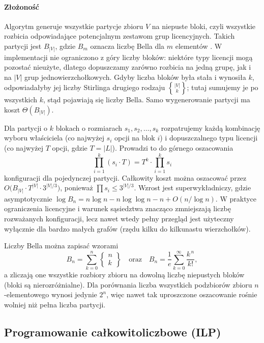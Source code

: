 \paragraph{Złożoność}
Algorytm generuje wszystkie partycje zbioru \(V\) na niepuste bloki, czyli wszystkie rozbicia odpowiadające potencjalnym zestawom grup licencyjnych. Takich partycji jest \(B_{|V|}\), gdzie \(B_m\) oznacza liczbę Bella dla \(m\) elementów \cite{stanley1997enumerative}. W implementacji nie ograniczono z góry liczby bloków: niektóre typy licencji mogą pozostać nieużyte, dlatego dopuszczamy zarówno rozbicia na jedną grupę, jak i na \(|V|\) grup jednowierzchołkowych. Gdyby liczba bloków była stała i wynosiła \(k\), odpowiadałyby jej liczby Stirlinga drugiego rodzaju \({|V| \brace k}\); tutaj sumujemy je po wszystkich \(k\), stąd pojawiają się liczby Bella. Samo wygenerowanie partycji ma koszt $\Theta(B_{|V|})$.

Dla partycji o \(k\) blokach o rozmiarach \(s_1, s_2, \ldots, s_k\) rozpatrujemy każdą kombinację wyboru właściciela (co najwyżej \(s_i\) opcji na blok \(i\)) i dopuszczalnego typu licencji (co najwyżej \(T\) opcji, gdzie \(T=|L|\)). Prowadzi to do górnego oszacowania
\[
  \prod_{i=1}^{k} (s_i \cdot T) = T^k \cdot \prod_{i=1}^{k} s_i
\]
konfiguracji dla pojedynczej partycji. Całkowity koszt można oszacować przez \(O\bigl(B_{|V|} \cdot T^{|V|} \cdot 3^{|V|/3}\bigr)\), ponieważ \(\prod s_i \leq 3^{|V|/3}\). Wzrost jest superwykładniczy, gdzie asymptotycznie \(\log B_n = n\log n - n\log\log n - n + O(n/\log n)\). W praktyce ograniczenia licencyjne i warunek sąsiedztwa znacząco zmniejszają liczbę rozważanych konfiguracji, lecz nawet wtedy pełny przegląd jest użyteczny wyłącznie dla bardzo małych grafów (rzędu kilku do kilkunastu wierzchołków).

Liczby Bella można zapisać wzorami
\[
  B_n = \sum_{k=0}^{n} \left\{\!\!\begin{array}{c} n \\ k \end{array}\!\!\right\}\quad\text{oraz}\quad B_n = \frac{1}{e}\sum_{k=0}^{\infty}\frac{k^{\,n}}{k!},
\]
a zliczają one wszystkie rozbiory zbioru na dowolną liczbę niepustych bloków (bloki są nierozróżnialne). Dla porównania liczba wszystkich podzbiorów zbioru \(n\)-elementowego wynosi jedynie \(2^n\), więc nawet tak uproszczone oszacowanie rośnie wolniej niż pełna liczba partycji.

\subsection{Programowanie całkowitoliczbowe (ILP)}\label{subsec:ilp}

